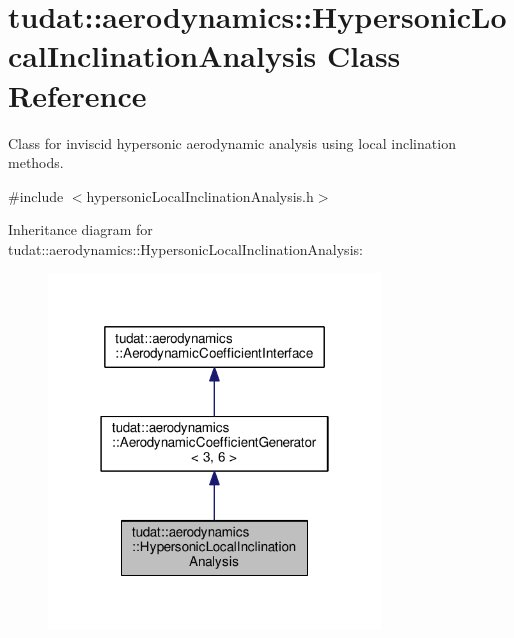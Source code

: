 \hypertarget{classtudat_1_1aerodynamics_1_1HypersonicLocalInclinationAnalysis}{}\section{tudat\+:\+:aerodynamics\+:\+:Hypersonic\+Local\+Inclination\+Analysis Class Reference}
\label{classtudat_1_1aerodynamics_1_1HypersonicLocalInclinationAnalysis}


Class for inviscid hypersonic aerodynamic analysis using local inclination methods.  




{\ttfamily \#include $<$hypersonic\+Local\+Inclination\+Analysis.\+h$>$}



Inheritance diagram for tudat\+:\+:aerodynamics\+:\+:Hypersonic\+Local\+Inclination\+Analysis\+:
\nopagebreak
\begin{figure}[H]
\begin{center}
\leavevmode
\includegraphics[width=250pt]{classtudat_1_1aerodynamics_1_1HypersonicLocalInclinationAnalysis__inherit__graph}
\end{center}
\end{figure}


